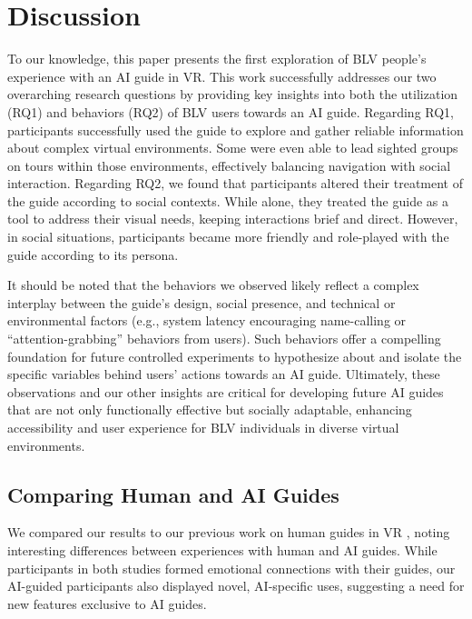 \section{Discussion}

To our knowledge, this paper presents the first exploration of BLV people’s experience with an AI guide in VR. This work successfully addresses our two overarching research questions by providing key insights into both the utilization (RQ1) and behaviors (RQ2) of BLV users towards an AI guide. Regarding RQ1, participants successfully used the guide to explore and gather reliable information about complex virtual environments. Some were even able to lead sighted groups on tours within those environments, effectively balancing navigation with social interaction. Regarding RQ2, we found that participants altered their treatment of the guide according to social contexts. While alone, they treated the guide as a tool to address their visual needs, keeping interactions brief and direct. However, in social situations, participants became more friendly and role-played with the guide according to its persona.

It should be noted that the behaviors we observed likely reflect a complex interplay between the guide’s design, social presence, and technical or environmental factors (e.g., system latency encouraging name-calling or “attention-grabbing” behaviors from users). Such behaviors offer a compelling foundation for future controlled experiments to hypothesize about and isolate the specific variables behind users’ actions towards an AI guide. Ultimately, these observations and our other insights are critical for developing future AI guides that are not only functionally effective but socially adaptable, enhancing accessibility and user experience for BLV individuals in diverse virtual environments.

\subsection{Comparing Human and AI Guides} \label{sec: Comparing Human and AI Guides}

We compared our results to our previous work on human guides in VR \cite{collins2023guide}, noting interesting differences between experiences with human and AI guides. While participants in both studies formed emotional connections with their guides, our AI-guided participants also displayed novel, AI-specific uses, suggesting a need for new features exclusive to AI guides.

